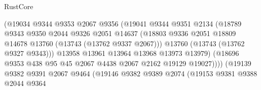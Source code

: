\begin{lexlean}{RustCore}
\begin{coremodule}
                                    (@19034
                                      @9344
                                      @9353
                                      @2067
                                      @9356
                                      (@19041
                                        @9344
                                        @9351
                                        @2134
                                        (@18789
                                          @9343
                                          @9350
                                          @2044
                                          @9326
                                          @2051
                                          @14637
                                          (@18803
                                            @9336
                                            @2051
                                            @18809
                                            @14678
                                            @13760
                                            (@13743 (@13762 @9337 @2067)))
                                          @13760
                                          (@13743 (@13762 @9327 @9343)))
                                        @13958
                                        @13961
                                        @13964
                                        @13968
                                        @13973
                                        @13979)
                                      (@18696
                                        @9353
                                        @438
                                        @95
                                        @45
                                        @2067
                                        @4438
                                        @2067
                                        @2162
                                        @19129
                                        @19027))))
                                (@19139
                                  @9382
                                  @9391
                                  @2067
                                  @9464
                                  (@19146
                                    @9382
                                    @9389
                                    @2074
                                    (@19153
                                      @9381
                                      @9388
                                      @2044
                                      @9364

\end{coremodule}
\end{lexlean}
